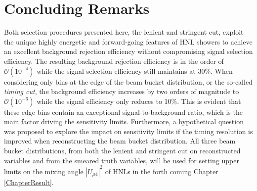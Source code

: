 
\section{Concluding Remarks}
\label{sec:select_conclude}

Both selection procedures presented here, the lenient and stringent cut, exploit the unique highly energetic and forward-going features of HNL showers to achieve an excellent background rejection efficiency without compromising signal selection efficiency.
The resulting background rejection efficiency is in the order of $\mathcal{O}(10^{-4})$ while the signal selection efficiency still maintains at 30\%. 
When considering only bins at the edge of the beam bucket distribution, or the so-called \textit{timing cut}, the background efficiency increases by two orders of magnitude to $\mathcal{O}(10^{-6})$ while the signal efficiency only reduces to 10\%. 
This is evident that these edge bins contain an exceptional signal-to-background ratio, which is the main factor driving the sensitivity limits.
Furthermore, a hypothetical question was proposed to explore the impact on sensitivity limits if the timing resolution is improved when reconstructing the beam bucket distribution.
All three beam bucket distributions, from both the lenient and stringent cut on reconstructed variables and from the smeared truth variables, will be used for setting upper limits on the mixing angle $|U_{\mu4}|^2$ of HNLs in the forth coming Chapter \ref{ChapterResult}. 


